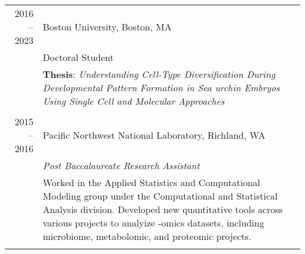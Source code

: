 \documentclass[a4paper,10pt]{report}
\begin{document}
\section{\color{linkcolour}{Professional History}}
\begin{tabular}{r|p{11cm}}
	\textsc{2016 -- 2023} & Boston University, Boston, MA                                                                                                                                                              \\
	                      & Doctoral Student                                                                                                                                                                           \\
	                      & \textbf{Thesis}: \emph{\footnotesize{Understanding Cell-Type Diversification During Developmental Pattern Formation in Sea urchin Embryos Using Single Cell and Molecular Approaches}}     \\
	\multicolumn{2}{c}{}                                                                                                                                                                                               \\[-0.5em]
	\textsc{2015 -- 2016} & Pacific Northwest National Laboratory, Richland, WA                                                                                                                                        \\
	                      & \emph{Post Baccalaureate Research Assistant}                                                                                                                                               \\
	                      & \footnotesize{Worked in the Applied Statistics and Computational Modeling
	group under the Computational and Statistical Analysis division. Developed new quantitative tools across various projects to analyize -omics datasets, including microbiome, metabolomic, and proteomic projects.} \\
	\multicolumn{2}{c}{}                                                                                                                                                                                               \\[-0.5em]


\end{tabular}
\end{document}
